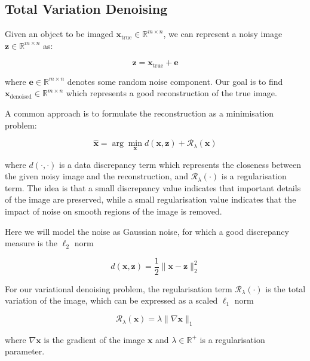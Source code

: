 \documentclass[12pt]{article}
\begin{document}
\subsection{Total Variation Denoising}


Given an object to be imaged $\mathbf{x}_{\text{true}} \in \mathbb{R}^{m \times n}$, we can represent a noisy image $\mathbf{z} \in \mathbb{R}^{m \times n}$ as:


\begin{equation}
  \mathbf{z} = \mathbf{x}_{\text{true}} + \mathbf{e}
\end{equation}
  
where 
$\mathbf{e} \in \mathbb{R}^{m \times n}$ denotes some random noise component.
Our goal is to find $\mathbf{x}_{\text{denoised}} \in \mathbb{R}^{m \times n}$ which represents a good reconstruction of the true image.

A common approach is to formulate the reconstruction as a minimisation problem:


\begin{equation}
  \hat{\mathbf{x}} = \arg \min_{\mathbf{x}} d(\mathbf{x}, \mathbf{z}) + \mathcal{R}_{\lambda}(\mathbf{x})
\end{equation}

where $d(\cdot, \cdot)$ is a data discrepancy term 
which represents the closeness between the given noisy image and the reconstruction, 
and $\mathcal{R}_{\lambda}(\cdot)$ is a regularisation term.
The idea is that a small discrepancy value indicates that important details of the image are preserved, while a small regularisation value indicates that the impact of noise on smooth regions of the image is removed.

Here we will model the noise as Gaussian noise, for which a good discrepancy measure is the $\ell_2$ norm

\begin{equation}
  d(\mathbf{x}, \mathbf{z}) = \frac{1}{2} \|\mathbf{x} - \mathbf{z}\|_2^2
\end{equation}

For our variational denoising problem, the regularisation term $\mathcal{R}_{\lambda}(\cdot)$ is the total variation of the image, which can be expressed as a scaled $\ell_1$ norm

\begin{equation}
  \mathcal{R}_{\lambda}(\mathbf{x}) = \lambda \| \nabla \mathbf{x} \|_1
\end{equation}

where $\nabla \mathbf{x}$ is the gradient of the image $\mathbf{x}$ and $\lambda \in \mathbb{R}^{+}$ is a regularisation parameter.
\end{document}

